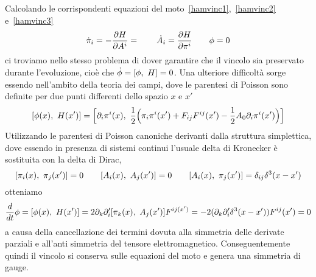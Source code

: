     Calcolando le corrispondenti equazioni del moto~\eqref{hamvinc1},~\eqref{hamvinc2} e~\eqref{hamvinc3} 
\begin{equation*}
    \dot \pi_i = - \frac{\partial H}{\partial A^i} = \qquad \dot A_i = \frac{\partial H}{\partial\pi^i} \qquad \phi = 0
\end{equation*}
    ci troviamo nello stesso problema di dover garantire che il vincolo sia preservato durante l'evoluzione, cioè che $\dot \phi = [\phi, ~H] = 0$. Una ulteriore difficoltà sorge essendo nell'ambito della teoria dei campi, dove le parentesi di Poisson sono definite per due punti differenti dello spazio $x$ e $x'$
\begin{equation*}
    [\phi(x), ~H(x')] = \Big[\partial_i \pi^i (x), ~ \frac{1}{2} \Big( \pi_i \pi^i (x') + F_{ij} F^{ij}(x') - \frac{1}{2} A_0 \partial_i \pi^i (x') \Big) \Big]
\end{equation*}
    Utilizzando le parentesi di Poisson canoniche derivanti dalla struttura simplettica, dove essendo in presenza di sistemi continui l'usuale delta di Kronecker è sostituita con la delta di Dirac,
\begin{equation*}
    [\pi_i(x), ~\pi_j(x')] = 0 \qquad [A_i(x), ~A_j(x')] = 0 \qquad [A_i(x), ~\pi_j(x')] = \delta_{ij} \delta^3(x - x')
\end{equation*}
    otteniamo 
\begin{equation*}
    \frac{d}{dt} \phi = [\phi(x), ~H(x')] = 2 \partial_k \partial'_i [\pi_k(x), ~A_j(x')] F^{ij(x')} = -2(\partial_k \partial'_i \delta^3(x - x')) F^{ij} (x') = 0
\end{equation*}
    a causa della cancellazione dei termini dovuta alla simmetria delle derivate parziali e all'anti simmetria del tensore elettromagnetico. Conseguentemente quindi il vincolo si conserva sulle equazioni del moto e genera una simmetria di gauge.
    
